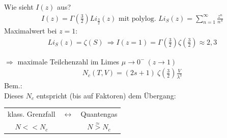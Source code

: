 Wie sieht $I(z)$ aus?
\begin{align}
    I(z)= \Gamma\left(\frac{3}{2}\right) Li_{\frac{3}{2}}(z) \text{ mit polylog. } Li_S(z)=\sum_{n=1}^\infty \frac{z^n}{n^S}
\end{align}
Maximalwert bei $z=1$:
\begin{align}
    Li_S(z)=\zeta(S) \ \Rightarrow I(z=1)=\Gamma\left(\frac{3}{2}\right) \zeta\left(\frac{3}{2}\right) \approx 2,3
\end{align}
\begin{center}
\end{center}
$\Rightarrow$ maximale Teilchenzahl im Limes $\mu \rightarrow 0^- \ (z \rightarrow 1)$
\begin{align}
    N_c(T,V) = (2s+1) \ \zeta\left(\frac{3}{2}\right) \frac{V}{\lambda^3}
\end{align}
Bem.:\\
Dieses $N_c$ entspricht  (bis auf Faktoren) dem Übergang:\\
\begin{center}
    \begin{tabular}{ccc}
    klass. Grenzfall & $\longleftrightarrow$ & Quantengas\\
    $N << N_c$ &  & $N \overset{\approx}{>} N_c$\\
\end{tabular}
\end{center}

